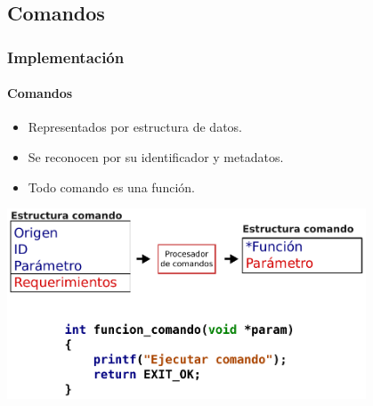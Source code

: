 \documentclass[xcolor=dvipsnames]{beamer}
\begin{document}
    \subsection{Comandos}
    \begin{frame}
        \frametitle{Implementación}
        \framesubtitle{Comandos}
        
        \begin{itemize}
            \item Representados por estructura de datos.
            \item Se reconocen por su identificador y metadatos.
            \item Todo comando es una función.
        \end{itemize}
        
        \begin{center}
            \includegraphics[width=0.8\textwidth]{img/implementacion_comandos.pdf}
        \end{center}
        
    \end{frame}
    
\end{document}
